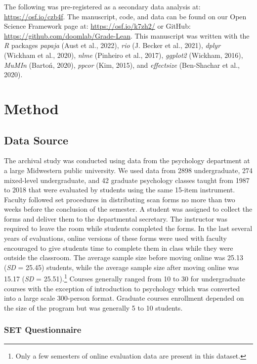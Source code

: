 \documentclass[
  man]{apa7}
\begin{document}
The following was pre-registered as a secondary data analysis at:
\url{https://osf.io/czb4f}. The manuscript, code, and data can be found on
our Open Science Framework page at: \url{https://osf.io/k7zh2/} or GitHub:
\url{https://github.com/doomlab/Grade-Lean}. This manuscript was written
with the \emph{R} packages \emph{papaja} (Aust et al., 2022), \emph{rio} (J. Becker et al., 2021), \emph{dplyr}
(Wickham et al., 2020), \emph{nlme} (Pinheiro et al., 2017), \emph{ggplot2} (Wickham, 2016), \emph{MuMIn}
(Bartoń, 2020), \emph{ppcor} (Kim, 2015), and \emph{effectsize} (Ben-Shachar et al., 2020).

\hypertarget{method}{%
\section{Method}\label{method}}

\hypertarget{data-source}{%
\subsection{Data Source}\label{data-source}}

The archival study was conducted using data from the psychology
department at a large Midwestern public university. We used data from
2898
undergraduate, 274
mixed-level undergraduate, and
42 graduate
psychology classes taught from 1987 to 2018 that were evaluated by
students using the same 15-item instrument. Faculty followed set
procedures in distributing scan forms no more than two weeks before the
conclusion of the semester. A student was assigned to collect the forms
and deliver them to the departmental secretary. The instructor was
required to leave the room while students completed the forms. In the
last several years of evaluations, online versions of these forms were
used with faculty encouraged to give students time to complete them in
class while they were outside the classroom. The average sample size
before moving online was 25.13 (\emph{SD} = 25.45) students, while the
average sample size after moving online was 15.17 (\emph{SD} = 25.51).\footnote{Only
  a few semesters of online evaluation data are present in this dataset.}
Courses generally ranged from 10 to 30 for undergraduate courses with
the exception of introduction to psychology which was converted into a
large scale 300-person format. Graduate courses enrollment depended on
the size of the program but was generally 5 to 10 students.

\hypertarget{set-questionnaire}{%
\subsubsection{SET Questionnaire}\label{set-questionnaire}}
\end{document}
